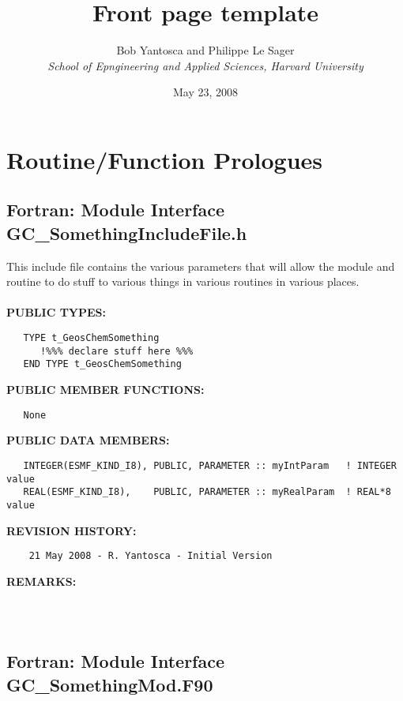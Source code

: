 \documentclass[11pt]{article}
\title{Front page template}
\author{{\sc Bob Yantosca and Philippe Le Sager}\\ {\em School of Epngineering and Applied Sciences, Harvard University}}
\date{May 23, 2008}
\begin{document}
\maketitle
\tableofcontents
\newpage
\section{Routine/Function Prologues} \label{app:ProLogues}

  \subsection{Fortran:  Module Interface GC\_SomethingIncludeFile.h }


  This include file contains the various parameters that will 
     allow the module and routine to do stuff to various things in various
     routines in various places.
  \\
  \\{\bf PUBLIC TYPES:}
\begin{verbatim}   TYPE t_GeosChemSomething
      !%%% declare stuff here %%%
   END TYPE t_GeosChemSomething\end{verbatim}{\bf PUBLIC MEMBER FUNCTIONS:}
\begin{verbatim}   None\end{verbatim}{\bf PUBLIC DATA MEMBERS:}
\begin{verbatim}   INTEGER(ESMF_KIND_I8), PUBLIC, PARAMETER :: myIntParam   ! INTEGER value
   REAL(ESMF_KIND_I8),    PUBLIC, PARAMETER :: myRealParam  ! REAL*8 value\end{verbatim}{\bf REVISION HISTORY:}
\begin{verbatim}    21 May 2008 - R. Yantosca - Initial Version\end{verbatim}{\bf REMARKS:}
\begin{verbatim} \end{verbatim}


 
 
\mbox{}\hrulefill\ 
 
 \subsection{Fortran:  Module Interface GC\_SomethingMod.F90 }
\end{document}
